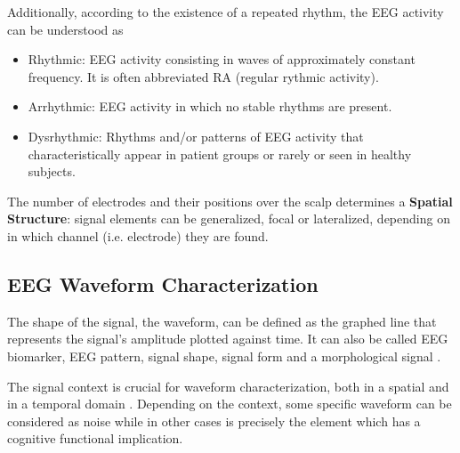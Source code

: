 \documentclass[sensors,article,submit,moreauthors,pdftex,10pt,a4paper]{mdpi}
\begin{document}
\noindent Additionally, according to the existence of a repeated rhythm, the EEG activity can be understood as

\begin{itemize}
\item Rhythmic: EEG activity consisting in waves of approximately constant frequency.  It is often abbreviated RA (regular rythmic activity).
\item Arrhythmic: EEG activity in which no stable rhythms are present.
\item Dysrhythmic: Rhythms and/or patterns of EEG activity that characteristically appear in patient groups or rarely or seen in healthy subjects.
\end{itemize}

The number of electrodes and their positions over the scalp determines a \textbf{Spatial Structure}: signal elements can be generalized, focal or lateralized, depending on in which channel (i.e. electrode) they are found.



\subsection{EEG Waveform Characterization}

The shape of the signal, the waveform, can be defined as the graphed line that represents the signal's amplitude plotted against time. It can also be called EEG biomarker,  EEG pattern, signal shape, signal form and a morphological signal \citep{Jansen1991}.

The signal context is crucial for waveform characterization, both in a spatial and in a temporal domain \citep{Jansen1991}.  Depending on the context, some specific waveform can be considered as noise while in other cases is precisely the element which has a cognitive functional implication.



%
\end{document}
